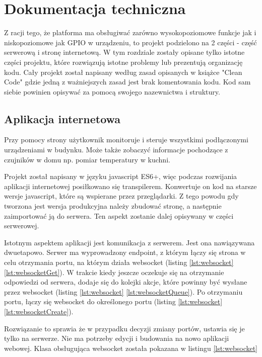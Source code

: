 \chapter{Dokumentacja techniczna}%
Z racji tego, że platforma ma obsługiwać zarówno wysokopoziomowe funkcje jak i niskopoziomowe jak GPIO w urządzeniu, to projekt podzielono na 2 części - część serwerową i stronę internetową. W tym rozdziale zostały opisane tylko istotne  części projektu, które rozwiązują istotne problemy lub prezentują organizację kodu. Cały projekt został napisany według zasad opisanych w książce "Clean Code" \cite{cleancode} gdzie jedną z ważniejszych zasad jest brak komentowania kodu. Kod sam siebie powinien opisywać za pomocą swojego nazewnictwa i struktury. 
\section{Aplikacja internetowa}
Przy pomocy strony użytkownik monitoruje i steruje wszystkimi podłączonymi urządzeniami w budynku. Może także zobaczyć informacje pochodzące z czujników w domu np. pomiar temperatury w kuchni. \par
Projekt został napisany w języku javascript ES6+, więc podczas rozwijania aplikacji internetowej posiłkowano się transpilerem. Konwertuje on kod na starsze wersje javascript, które są wspierane przez przeglądarki. Z tego powodu gdy tworzona jest  wersja produkcyjna należy zbudować stronę, a następnie zaimportować ją do serwera. Ten aspekt zostanie dalej opisywany w części serwerowej.
\par Istotnym aspektem aplikacji jest komunikacja z serwerem. Jest ona nawiązywana dwuetapowo.
Serwer ma wyprowadzony endpoint, z którym łączy się strona w celu otrzymania portu, na którym działa websocket
(listing \ref{lst:websocket} \ref{lst:websocketGet}). W trakcie kiedy jeszcze oczekuje się na otrzymanie odpowiedzi od serwera, dodaje się do kolejki akcje, które powinny być wysłane przez websocket (listing \ref{lst:websocket} \ref{lst:websocketQueue}). Po otrzymaniu portu, łączy się websocket do określonego portu (listing \ref{lst:websocket} \ref{lst:websocketCreate}). 
\par Rozwiązanie to sprawia że w przypadku decyzji zmiany portów, ustawia się je tylko na serwerze. Nie ma potrzeby edycji i budowania na nowo aplikacji webowej. Klasa obsługująca websocket została pokazana w listingu \ref{lst:websocket}
\newpage
